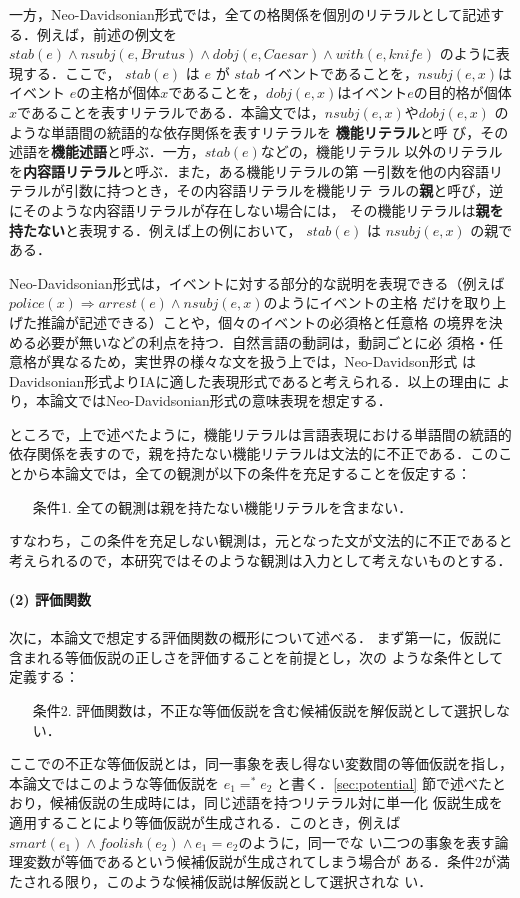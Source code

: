 \documentclass[japanese]{jnlp_1.4}
\begin{document}
一方，Neo-Davidsonian形式では，全ての格関係を個別のリテラルとして記述す
る．例えば，前述の例文を $\mathit{stab}(e) \land \mathit{nsubj}(e,\mathit{Brutus}) \land
\mathit{dobj}(e,\mathit{Caesar}) \land \mathit{with}(e,\mathit{knife})$ のように表現する．ここで，
$\mathit{stab}(e)$ は $e$ が $\mathit{stab}$ イベントであることを，$\mathit{nsubj}(e,x)$はイベント
$e$の主格が個体$x$であることを，$\mathit{dobj}(e,x)$はイベント$e$の目的格が個体
$x$であることを表すリテラルである．本論文では，$\mathit{nsubj}(e,x)$や$\mathit{dobj}(e,x)$
のような単語間の統語的な依存関係を表すリテラルを \textbf{機能リテラル}と呼
び，その述語を\textbf{機能述語}と呼ぶ．一方，$\mathit{stab}(e)$などの，機能リテラル
以外のリテラルを\textbf{内容語リテラル}と呼ぶ．また，ある機能リテラルの第
一引数を他の内容語リテラルが引数に持つとき，その内容語リテラルを機能リテ
ラルの\textbf{親}と呼び，逆にそのような内容語リテラルが存在しない場合には，
その機能リテラルは\textbf{親を持たない}と表現する．例えば上の例において，
$\mathit{stab}(e)$ は $\mathit{nsubj}(e,x)$ の親である．


Neo-Davidsonian形式は，イベントに対する部分的な説明を表現できる（例えば
$\mathit{police}(x) \Rightarrow \mathit{arrest}(e) \land \mathit{nsubj}(e,x)$のようにイベントの主格
だけを取り上げた推論が記述できる）ことや，個々のイベントの必須格と任意格
の境界を決める必要が無いなどの利点を持つ．自然言語の動詞は，動詞ごとに必
須格・任意格が異なるため，実世界の様々な文を扱う上では，Neo-Davidson形式
はDavidsonian形式よりIAに適した表現形式であると考えられる．以上の理由に
より，本論文ではNeo-Davidsonian形式の意味表現を想定する．

ところで，上で述べたように，機能リテラルは言語表現における単語間の統語的
依存関係を表すので，親を持たない機能リテラルは文法的に不正である．このこ
とから本論文では，全ての観測が以下の条件を充足することを仮定する：
\begin{itemize}
\item[条件1.] 全ての観測は親を持たない機能リテラルを含まない．
\end{itemize}
すなわち，この条件を充足しない観測は，元となった文が文法的に不正であると
考えられるので，本研究ではそのような観測は入力として考えないものとする．


\paragraph{(2) 評価関数　}
次に，本論文で想定する評価関数の概形について述べる．
まず第一に，仮説に含まれる等価仮説の正しさを評価することを前提とし，次の
ような条件として定義する：
\begin{itemize}
\item[条件2.] 評価関数は，不正な等価仮説を含む候補仮説を解仮説として選択しない．
\end{itemize}
ここでの不正な等価仮説とは，同一事象を表し得ない変数間の等価仮説を指し，
本論文ではこのような等価仮説を $e_1=^*e_2$ と書く．\ref{sec:potential} 節で述べたとおり，候補仮説の生成時には，同じ述語を持つリテラル対に単一化
仮説生成を適用することにより等価仮説が生成される．このとき，例えば
$\mathit{smart}(e_1) \land \mathit{foolish}(e_2) \land e_1=e_2$のように，同一でな
い二つの事象を表す論理変数が等価であるという候補仮説が生成されてしまう場合が
ある．条件2が満たされる限り，このような候補仮説は解仮説として選択されな
い．
\end{document}
